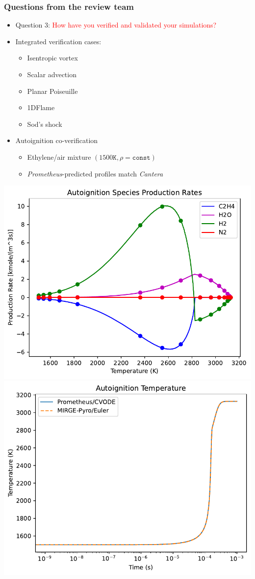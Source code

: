 \begin{frame}\frametitle{Questions from the review team}
  \begin{itemize}
    \item Question 3: \textcolor{red}{How have you verified and validated  your simulations?}
  \end{itemize}
  \begin{multicols}{2}
    \begin{itemize}
    \item Integrated verification cases:
      \begin{itemize}
      \item Isentropic vortex %
      \item Scalar advection %
      \item Planar Poiseuille %
      \item 1DFlame  %
      \item Sod's shock   %
      \end{itemize}
      \columnbreak
    \item Autoignition co-verification
      \begin{itemize}
      \item Ethylene/air mixture $(1500\mathtt{K}, \rho=\mathtt{const})$
      \item \textit{Prometheus}-predicted profiles match \textit{Cantera}
      \end{itemize}
    \end{itemize}
  \end{multicols}
  \begin{multicols}{2}
    \includegraphics[width=.45\textwidth]{figures/autoignition_rates.pdf}\\
    \columnbreak
    \includegraphics[width=.45\textwidth]{figures/autoignition_temperature.pdf}
  \end{multicols}
\end{frame}

